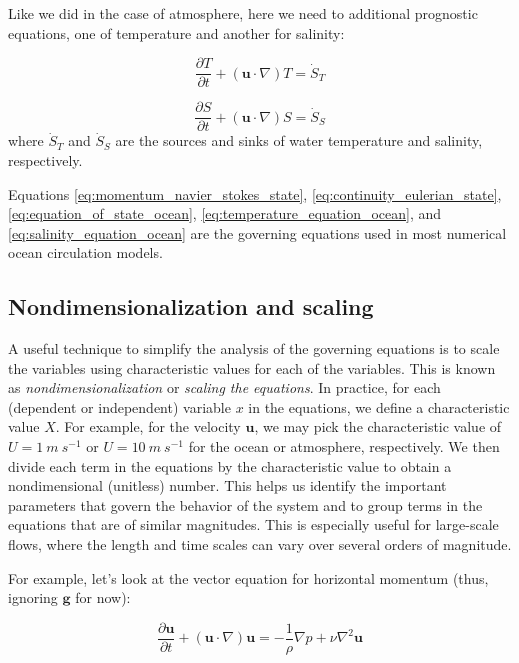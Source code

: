 \documentclass[12pt]{article}
\numberwithin{equation}{section}
\numberwithin{figure}{section}
\numberwithin{table}{section}
\begin{document}
Like we did in the case of atmosphere, here we need to additional prognostic
equations, one of temperature and another for salinity:

\begin{equation}
  \frac{\partial T}{\partial t} + (\mathbf{u} \cdot \nabla) T = \dot{S}_T
  \label{eq:temperature_equation_ocean}
\end{equation}

\begin{equation}
  \frac{\partial S}{\partial t} + (\mathbf{u} \cdot \nabla) S = \dot{S}_S
  \label{eq:salinity_equation_ocean}
\end{equation}
where $\dot{S}_T$ and $\dot{S}_S$ are the sources and sinks of water temperature
and salinity, respectively.

Equations \ref{eq:momentum_navier_stokes_state},
\ref{eq:continuity_eulerian_state},
\ref{eq:equation_of_state_ocean},
\ref{eq:temperature_equation_ocean}, and
\ref{eq:salinity_equation_ocean} are the governing equations used in most
numerical ocean circulation models.

\subsection{Nondimensionalization and scaling}
\label{sec:nondimensionalization_and_scaling}

A useful technique to simplify the analysis of the governing equations is to
scale the variables using characteristic values for each of the variables.
This is known as \textit{nondimensionalization}
or \textit{scaling the equations}.
In practice, for each (dependent or independent) variable $x$ in the equations,
we define a characteristic value $X$.
For example, for the velocity $\mathbf{u}$, we may pick the characteristic
value of $U = 1\ m\ s^{-1}$ or $U = 10\ m\ s^{-1}$ for the ocean or atmosphere,
respectively.
We then divide each term in the equations by the characteristic value to
obtain a nondimensional (unitless) number.
This helps us identify the important parameters that govern the behavior of
the system and to group terms in the equations that are of similar magnitudes.
This is especially useful for large-scale flows, where the length and time
scales can vary over several orders of magnitude.

For example, let's look at the vector equation for horizontal momentum
(thus, ignoring $\mathbf{g}$ for now):

\begin{equation}
  \frac{\partial \mathbf{u}}{\partial t} + (\mathbf{u} \cdot \nabla) \mathbf{u} =
  - \frac{1}{\rho} \nabla p + \nu \nabla^2 \mathbf{u}
\end{equation}
\end{document}
